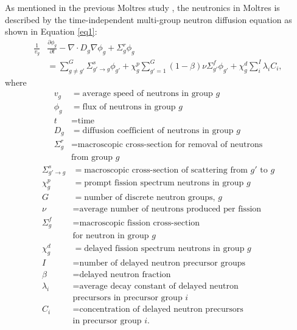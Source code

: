 \documentclass{anstrans}
\begin{document}
	As mentioned in the previous Moltres study
	\cite{lindsay_introduction_2018}, the neutronics in Moltres is described by
	the time-independent multi-group neutron diffusion equation as shown in
	Equation \ref{eq1}:
%
\begin{align}
	\frac{1}{v_g} &\frac{\partial \phi_g}{\partial t} - \nabla \cdot D_g \nabla
	\phi_g + \Sigma^r_g \phi_g \nonumber \\ 
	&= \sum^G_{g \neq g'} \Sigma^s_{g' \rightarrow g} \phi_{g'} + \chi^p_g
	\sum^G_{g'=1} (1-\beta) \nu \Sigma^f_{g'} \phi_{g'} + \chi^d_g \sum^I_i
	\lambda_i C_i, \label{eq1}
\end{align}
%
	where
{\small
\begin{align*}
	v_g &= \text{average speed of neutrons in group }g \\
	\phi_g &= \text{flux of neutrons in group }g \\
	t &= \text{time} \\
	D_g &= \text{diffusion coefficient of neutrons in group }g \\
	\Sigma^r_g &= \text{macroscopic cross-section for removal of neutrons} 
	\nonumber \\
	&\text{from group }g
\end{align*}
%
\begin{align*}
	\Sigma^s_{g' \rightarrow g} &= \text{macroscopic cross-section of
	scattering from }g' \text{ to }g \\
	\chi^p_g &= \text{prompt fission spectrum neutrons in group }g \\
	G &= \text{number of discrete neutron groups, }g \\
	\nu &= \text{average number of neutrons produced per fission} \\
	\Sigma^f_{g} &= \text{macroscopic fission cross-section} \nonumber \\
	&\text{for neutron in group }g \\
	\chi^d_g &= \text{delayed fission spectrum neutrons in group }g \\
	I &= \text{number of delayed neutron precursor groups} \\
	\beta &= \text{delayed neutron fraction} \\
	\lambda_i &= \text{average decay constant of delayed neutron} \nonumber \\
	&\text{precursors in precursor group }i \\
	C_i &= \text{concentration of delayed neutron precursors} \nonumber \\
	&\text{in precursor group }i .
\end{align*}
}
\end{document}
